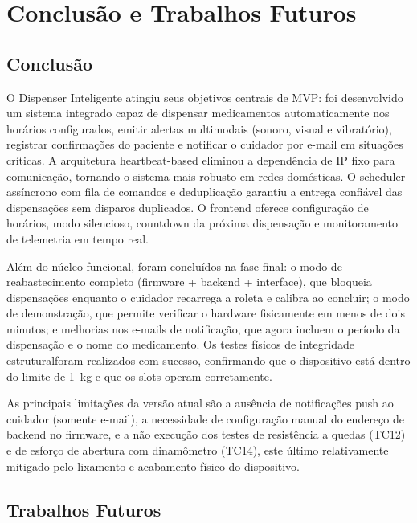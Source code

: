 \documentclass[12pt,a4paper]{article}
\begin{document}
\newpage

\section{Conclusão e Trabalhos Futuros}

\subsection{Conclusão}

O Dispenser Inteligente atingiu seus objetivos centrais de MVP: foi desenvolvido um sistema integrado capaz de dispensar medicamentos automaticamente nos horários configurados, emitir alertas multimodais (sonoro, visual e vibratório), registrar confirmações do paciente e notificar o cuidador por e-mail em situações críticas. A arquitetura heartbeat-based eliminou a dependência de IP fixo para comunicação, tornando o sistema mais robusto em redes domésticas. O scheduler assíncrono com fila de comandos e deduplicação garantiu a entrega confiável das dispensações sem disparos duplicados. O frontend oferece configuração de horários, modo silencioso, countdown da próxima dispensação e monitoramento de telemetria em tempo real.

Além do núcleo funcional, foram concluídos na fase final: o modo de reabastecimento completo (firmware + backend + interface), que bloqueia dispensações enquanto o cuidador recarrega a roleta e calibra ao concluir; o modo de demonstração, que permite verificar o hardware fisicamente em menos de dois minutos; e melhorias nos e-mails de notificação, que agora incluem o período da dispensação e o nome do medicamento. Os testes físicos de integridade estruturalforam realizados com sucesso, confirmando que o dispositivo está dentro do limite de 1~kg e que os slots operam corretamente.

As principais limitações da versão atual são a ausência de notificações push ao cuidador (somente e-mail), a necessidade de configuração manual do endereço de backend no firmware, e a não execução dos testes de resistência a quedas (TC12) e de esforço de abertura com dinamômetro (TC14), este último relativamente mitigado pelo lixamento e acabamento físico do dispositivo.

\subsection{Trabalhos Futuros}
\end{document}
